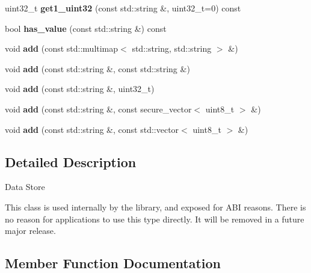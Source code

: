 \begin{DoxyCompactItemize}
uint32\+\_\+t {\bfseries get1\+\_\+uint32} (const std\+::string \&, uint32\+\_\+t=0) const
\item 
\mbox{\label{class_botan_1_1_data___store_aafc5f8638f5246ec0c5f40512eb282a0}} 
bool {\bfseries has\+\_\+value} (const std\+::string \&) const
\item 
\mbox{\label{class_botan_1_1_data___store_a83319d25d3d220c6c45f8263f5f7d762}} 
void {\bfseries add} (const std\+::multimap$<$ std\+::string, std\+::string $>$ \&)
\item 
\mbox{\label{class_botan_1_1_data___store_a2b305c27d3ea0eafaf4e4e6cba49fabc}} 
void {\bfseries add} (const std\+::string \&, const std\+::string \&)
\item 
\mbox{\label{class_botan_1_1_data___store_af5e1b8f92bee8933bd7741875f5ce1e6}} 
void {\bfseries add} (const std\+::string \&, uint32\+\_\+t)
\item 
\mbox{\label{class_botan_1_1_data___store_a33d8c85ea41afed8b5e6697ad8072b01}} 
void {\bfseries add} (const std\+::string \&, const secure\+\_\+vector$<$ uint8\+\_\+t $>$ \&)
\item 
\mbox{\label{class_botan_1_1_data___store_a35d93f5b346a4c9a0e98e41ac6e574fb}} 
void {\bfseries add} (const std\+::string \&, const std\+::vector$<$ uint8\+\_\+t $>$ \&)
\end{DoxyCompactItemize}


\subsection{Detailed Description}
Data Store

This class is used internally by the library, and exposed for A\+BI reasons. There is no reason for applications to use this type directly. It will be removed in a future major release. 

\subsection{Member Function Documentation}
\mbox{\label{class_botan_1_1_data___store_a8c889aa5cbadc64821c72e77f3a6a19c}} 
